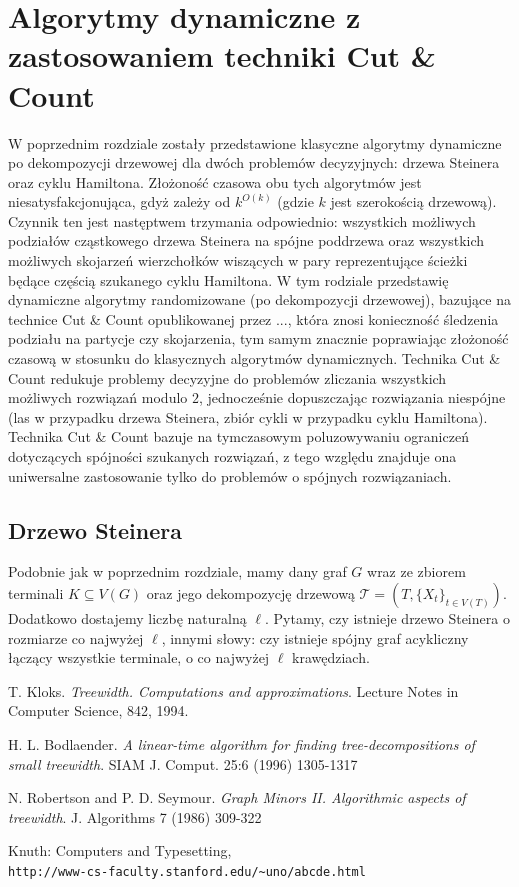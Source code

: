 \documentclass[12pt, oneside]{report}
\newcommand\Omicron{O}
\begin{document}
\newpage
  	\chapter{Algorytmy dynamiczne z zastosowaniem techniki Cut \& Count}

W poprzednim rozdziale zostały przedstawione klasyczne algorytmy dynamiczne po dekompozycji drzewowej dla dwóch problemów decyzyjnych: drzewa Steinera oraz cyklu Hamiltona. Złożoność czasowa obu tych algorytmów jest niesatysfakcjonująca, gdyż zależy od $k^{\Omicron{(k)}}$ (gdzie $k$ jest szerokością drzewową). Czynnik ten jest następtwem trzymania odpowiednio: wszystkich możliwych podziałów cząstkowego drzewa Steinera na spójne poddrzewa oraz wszystkich możliwych skojarzeń wierzchołków wiszących w pary reprezentujące ścieżki będące częścią szukanego cyklu Hamiltona. W tym rodziale przedstawię dynamiczne algorytmy randomizowane (po dekompozycji drzewowej), bazujące na technice Cut \& Count opublikowanej przez ..., która znosi konieczność śledzenia podziału na partycje czy skojarzenia, tym samym znacznie poprawiając złożoność czasową w stosunku do klasycznych algorytmów dynamicznych. Technika Cut \& Count redukuje problemy decyzyjne do problemów zliczania wszystkich możliwych rozwiązań modulo $2$, jednocześnie dopuszczając rozwiązania niespójne (las w przypadku drzewa Steinera, zbiór cykli w przypadku cyklu Hamiltona). Technika Cut \& Count bazuje na tymczasowym poluzowywaniu ograniczeń dotyczących spójności szukanych rozwiązań, z tego względu znajduje ona uniwersalne zastosowanie tylko do problemów o spójnych rozwiązaniach.

    	\section{Drzewo Steinera}
Podobnie jak w poprzednim rozdziale, mamy dany graf $G$ wraz ze zbiorem terminali $K \subseteq V(G)$ oraz jego dekompozycję drzewową $\mathcal{T} = (T, \{X_t\}_{t \in V(T)})$. Dodatkowo dostajemy liczbę naturalną $\ell$. Pytamy, czy istnieje drzewo Steinera o rozmiarze co najwyżej $\ell$, innymi słowy: czy istnieje spójny graf acykliczny łączący wszystkie terminale, o co najwyżej $\ell$ krawędziach.


\newpage
	\begin{thebibliography}{9}
			T. Kloks. 
			\textit{Treewidth. Computations and approximations}. 
			Lecture Notes in Computer Science, 842, 1994.
 
			H. L. Bodlaender. 
			\textit{A linear-time algorithm for finding tree-decompositions of small treewidth}. 
			SIAM J. Comput. 25:6 (1996) 1305-1317
			
			N. Robertson and P. D. Seymour. 
			\textit{Graph Minors II. Algorithmic aspects of treewidth}. 
			J. Algorithms 7 (1986) 309-322
 
			Knuth: Computers and Typesetting,
			\\\texttt{http://www-cs-faculty.stanford.edu/\~{}uno/abcde.html}
	\end{thebibliography} 
\end{document}
